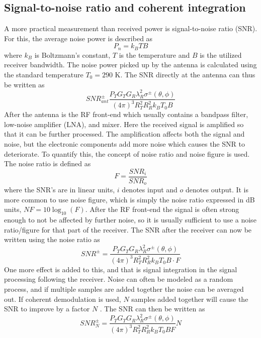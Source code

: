 \documentclass[11pt,twoside]{eitExjobb}
\begin{document}
	\subsection{Signal-to-noise ratio and coherent integration}
	A more practical measurement than received power is signal-to-noise ratio (SNR). For this, the average noise power is described as \cite{Young2004}
	\begin{equation*}
		P_n = k_B TB
	\end{equation*}
	where $k_B$ is Boltzmann's constant, $T$ is the temperature and $B$ is the utilized receiver bandwidth. The noise power picked up by the antenna is calculated using the standard temperature $T_0 = 290$ K. The SNR directly at the antenna can thus be written as
	\begin{equation*}
		\mathit{SNR}^\pm_{ant} \frac{P_T G_T G_R \lambda_R^2 \sigma^\pm (\theta,\phi)}{(4\pi)^3 R_T^2 R_R^2 k_B T_0 B}
	\end{equation*}
	After the antenna is the RF front-end which usually contains a bandpass filter, low-noise amplifier (LNA), and mixer. Here the received signal is amplified so that it can be further processed. The amplification affects both the signal and noise, but the electronic components add more noise which causes the SNR to deteriorate. To quantify this, the concept of noise ratio and noise figure is used. The noise ratio is defined as \cite{Young2004}
	\begin{equation*}
		F = \frac{\mathit{SNR}_i}{\mathit{SNR}_o}
	\end{equation*}
	where the SNR's are in linear units, $i$ denotes input and $o$ denotes output. It is more common to use noise figure, which is simply the noise ratio expressed in dB units, $\mathit{NF} = 10\log_{10}(F)$. After the RF front-end the signal is often strong enough to not be affected by further noise, so it is usually sufficient to use a noise ratio/figure for that part of the receiver. The SNR after the receiver can now be written using the noise ratio as
	\begin{equation*}
		\mathit{SNR}^\pm = \frac{P_T G_T G_R \lambda_R^2 \sigma^\pm (\theta,\phi)}{(4\pi)^3 R_T^2 R_R^2 k_B T_0 B \cdot F}
	\end{equation*}
	One more effect is added to this, and that is signal integration in the signal processing following the receiver. Noise can often be modeled as a random process, and if multiple samples are added together the noise can be averaged out. If coherent demodulation is used, $N$ samples added together will cause the SNR to improve by a factor $N$ \cite{Richards2012}. The SNR can then be written as
	\begin{equation*}
		\mathit{SNR}^\pm_N = \frac{P_T G_T G_R \lambda_R^2 \sigma^\pm (\theta,\phi)}{(4\pi)^3 R_T^2 R_R^2 k_B T_0 B F} N
	\end{equation*}
	
\end{document}
